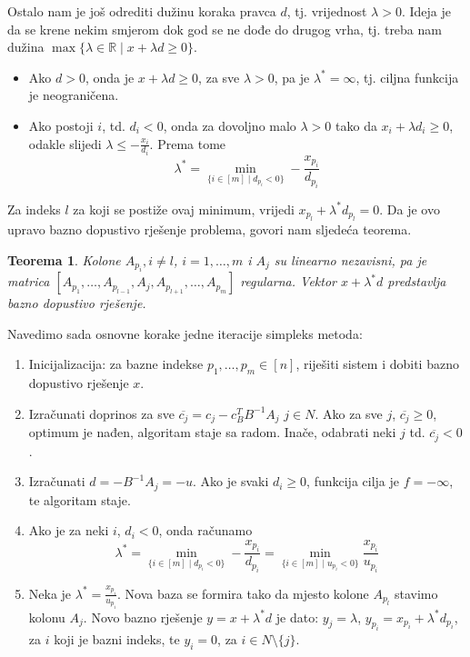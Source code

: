 \documentclass[a4paper, utf8, 11pt, colorlinks]{book}
\newtheorem{thm}{Teorema}
\begin{document}
Ostalo nam je još odrediti dužinu koraka pravca $d$, tj. vrijednost $\lambda>0$. Ideja je da se krene nekim smjerom dok god se ne dođe do drugog vrha, tj. treba nam dužina $\max \{ \lambda \in \mathbb{R} \mid x + \lambda d \geq 0 \}$. 
\begin{itemize}
    \item Ako $d >0$, onda je $  x + \lambda d \geq 0$, za sve $\lambda > 0$, pa je $\lambda^* = \infty$, tj. ciljna funkcija je neograničena.
    \item Ako postoji $i$, td. $d_i < 0$, onda za dovoljno malo $\lambda>0$ tako da $x_i + \lambda d_i \geq 0$, odakle slijedi $\lambda \leq -\frac{x_i}{d_i}$. Prema tome 
    $$ \lambda^* = \min_{ \{i\in [m] \mid d_{p_i} < 0  \}} - \frac{x_{p_i}}{d_{p_i}} $$
\end{itemize}
Za indeks $l$ za koji se postiže ovaj minimum, vrijedi $x_{p_l} + \lambda^* d_{p_l}=0$.
Da je ovo upravo bazno dopustivo rješenje problema, govori nam sljedeća teorema. 
\begin{thm}
    Kolone $A_{p_i}, i\not = l$, $i=1,\ldots,m$ i $A_{j}$ su linearno nezavisni, pa je matrica 
    $[A_{p_1},\ldots, A_{p_{l-1}}, A_j, A_{p_{l+1}}, \ldots, A_{p_m}]$
    regularna. Vektor $x + \lambda^* d$ predstavlja bazno dopustivo rješenje. 
\end{thm}

Navedimo sada osnovne korake jedne iteracije simpleks metoda:
\begin{enumerate}
    \item Inicijalizacija: za bazne indekse $p_1,\ldots,p_m \in [n]$, riješiti sistem i dobiti bazno dopustivo rješenje $x$. 
    \item Izračunati doprinos za sve $\overline{c_j} = c_j - c_B^T B^{-1}A_j $
          $j \in N$. Ako za sve $j$, $\overline{c_j} \geq 0$, optimum je nađen, algoritam staje sa radom. Inače, odabrati neki $j$  td. $\overline{c_j}<0$.
    \item Izračunati $d = -B^{-1}A_j = -u$. Ako je svaki $d_i \geq  0$, funkcija cilja je $f = - \infty$, te algoritam staje. 
    \item Ako je za neki $i$, $d_i < 0$, onda računamo 
             $$ \lambda^* = \min_{ \{i\in [m] \mid d_{p_i} < 0  \}} - \frac{x_{p_i}}{d_{p_i}} =  \min_{ \{i\in [m] \mid u_{p_i} < 0  \}} \frac{x_{p_i}}{u_{p_i}} $$
    \item Neka je $\lambda^* = \frac{x_{p_i}}{u_{p_i}}$. Nova baza se formira tako da mjesto kolone $A_{p_l}$ stavimo kolonu $A_j$. Novo bazno rješenje 
    $y = x + \lambda^*d $ je dato: $y_j = \lambda$, $y_{p_i} = x_{p_i} + \lambda^* d_{p_i}$, za $i$ koji je bazni indeks, te $y_i = 0$, za $i \in N \setminus \{j\}$. 
\end{enumerate}
\end{document}
